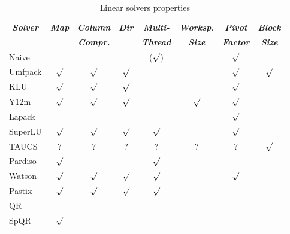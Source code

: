 \begin{table}
\centering
\caption{Linear solvers properties}\label{tab:linear-solvers-props}
\begin{tabular}{lccccccc}
\hline
	\multicolumn{1}{c}{\textbf{\emph{Solver}}} &
	\multicolumn{1}{c}{\textbf{\emph{Map}}} &
	\multicolumn{1}{c}{\textbf{\emph{Column}}} &
	\multicolumn{1}{c}{\textbf{\emph{Dir}}} &
	\multicolumn{1}{c}{\textbf{\emph{Multi-}}} &
	\multicolumn{1}{c}{\textbf{\emph{Worksp.}}} &
	\multicolumn{1}{c}{\textbf{\emph{Pivot}}} &
	\multicolumn{1}{c}{\textbf{\emph{Block}}} \\
	& & \multicolumn{1}{c}{\textbf{\emph{Compr.}}} &
	& \multicolumn{1}{c}{\textbf{\emph{Thread}}}
	& \multicolumn{1}{c}{\textbf{\emph{Size}}}
	& \multicolumn{1}{c}{\textbf{\emph{Factor}}}
	& \multicolumn{1}{c}{\textbf{\emph{Size}}} \\
\hline\hline
	Naive		&         &         &         & ($\surd$) &         & $\surd$ &	        \\
	Umfpack		& $\surd$ & $\surd$ & $\surd$ &           &         & $\surd$ & $\surd$ \\
	KLU		& $\surd$ & $\surd$ & $\surd$ &           &         & $\surd$ &	        \\
	Y12m		& $\surd$ & $\surd$ & $\surd$ &	          & $\surd$ & $\surd$ &	        \\
	Lapack		&         &         &         &           &         & $\surd$ &         \\
	SuperLU		& $\surd$ & $\surd$ & $\surd$ & $\surd$   &         & $\surd$ &	        \\
	TAUCS		& ?       & ?       & ?       & ?         & ?       & ?       & $\surd$ \\
	Pardiso		& $\surd$ &         &         & $\surd$   &         &         &	        \\
	Watson		& $\surd$ & $\surd$ & $\surd$ & $\surd$   &         & $\surd$ &	        \\
	Pastix		& $\surd$ & $\surd$ & $\surd$ & $\surd$   &         &         &	        \\
	QR		&         &         &         &           &         &         &	        \\
	SpQR		& $\surd$ &         &         &           &         &         &	        \\
\hline
\end{tabular}
\end{table}

